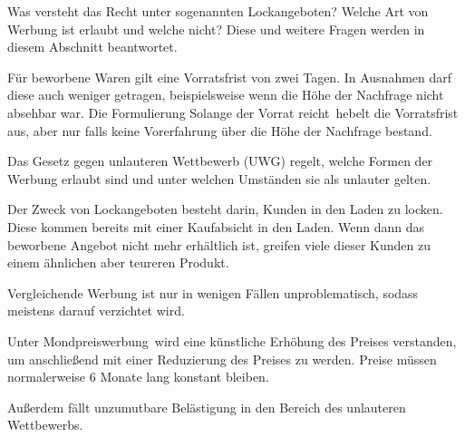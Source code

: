 Was versteht das Recht unter sogenannten \ql Lockangeboten\qr? Welche Art von Werbung ist erlaubt und welche nicht? Diese und weitere Fragen werden in diesem Abschnitt beantwortet.

Für beworbene Waren gilt eine Vorratsfrist von zwei Tagen. In Ausnahmen darf diese auch weniger getragen, beispielsweise wenn die Höhe der Nachfrage nicht absehbar war. Die Formulierung \ql Solange der Vorrat reicht\qr\ hebelt die Vorratsfrist aus, aber nur falls keine Vorerfahrung über die Höhe der Nachfrage bestand.

Das Gesetz gegen unlauteren Wettbewerb (UWG) regelt, welche Formen der Werbung erlaubt sind und unter welchen Umständen sie als unlauter gelten.

Der Zweck von Lockangeboten besteht darin, Kunden in den Laden zu locken. Diese kommen bereits mit einer Kaufabsicht in den Laden. Wenn dann das beworbene Angebot nicht mehr erhältlich ist, greifen viele dieser Kunden zu einem ähnlichen aber teureren Produkt. 

Vergleichende Werbung ist nur in wenigen Fällen unproblematisch, sodass meistens darauf verzichtet wird.

Unter \ql Mondpreiswerbung\qr\ wird eine künstliche Erhöhung des Preises verstanden, um anschließend mit einer Reduzierung des Preises zu werden. Preise müssen normalerweise 6 Monate lang konstant bleiben.

Außerdem fällt unzumutbare Belästigung in den Bereich des unlauteren Wettbewerbs.

